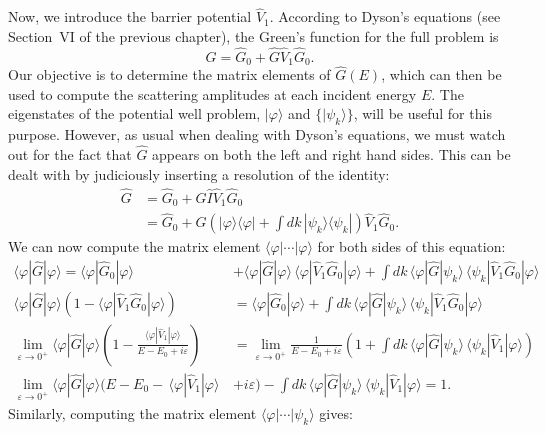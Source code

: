 \documentclass[pra,12pt]{revtex4}
\begin{document}
Now, we introduce the barrier potential $\hat{V}_1$.  According to
Dyson's equations (see Section~VI of the previous chapter), the
Green's function for the full problem is
$$\hat{G} = \hat{G}_0 + \hat{G} \hat{V}_1 \hat{G}_0.$$
Our objective is to determine the matrix elements of $\hat{G}(E)$,
which can then be used to compute the scattering amplitudes at each
incident energy $E$.  The eigenstates of the potential well problem,
$|\varphi\rangle$ and $\{|\psi_k\rangle\}$, will be useful for this
purpose.  However, as usual when dealing with Dyson's equations, we
must watch out for the fact that $\hat{G}$ appears on both the left
and right hand sides.  This can be dealt with by judiciously inserting
a resolution of the identity:
$$\begin{aligned}\hat{G} &= \hat{G}_0 + \hat{G} \hat{I} \hat{V}_1 \hat{G}_0 \\ &= \hat{G}_0 + \hat{G} \left(|\varphi\rangle\langle\varphi| + \int dk\, |\psi_k\rangle\langle\psi_k|\right) \hat{V}_1 \hat{G}_0. \end{aligned}$$
We can now compute the matrix element
$\langle\varphi|\cdots|\varphi\rangle$ for both sides of this equation:
$$\begin{aligned}\langle\varphi|\hat{G}|\varphi\rangle = \langle\varphi|\hat{G}_0|\varphi\rangle &+ \langle\varphi|\hat{G}|\varphi\rangle \, \langle\varphi|\hat{V}_1 \hat{G}_0|\varphi\rangle + \int dk\, \langle\varphi|\hat{G}|\psi_k\rangle \, \langle\psi_k| \hat{V}_1 \hat{G}_0|\varphi\rangle \\
\langle\varphi|\hat{G}|\varphi\rangle \left(1 - \langle\varphi|\hat{V}_1 \hat{G}_0|\varphi\rangle\right) &= \langle\varphi|\hat{G}_0|\varphi\rangle + \int dk\, \langle\varphi|\hat{G}|\psi_k\rangle \, \langle\psi_k| \hat{V}_1 \hat{G}_0|\varphi\rangle \\ \lim_{\varepsilon\rightarrow0^+}
\langle\varphi|\hat{G}|\varphi\rangle \left(1 - \frac{\langle\varphi|\hat{V}_1|\varphi\rangle}{E - E_0 + i\varepsilon}\right) &= \lim_{\varepsilon\rightarrow0^+} \frac{1}{E  - E_0 + i\varepsilon} \left(1+ \int dk\, \langle\varphi|\hat{G}|\psi_k\rangle \, \langle\psi_k| \hat{V}_1|\varphi\rangle \right) \\
\lim_{\varepsilon\rightarrow0^+} \langle\varphi|\hat{G}|\varphi\rangle \Big(E - E_0 -\, \langle\varphi|\hat{V}_1|\varphi\rangle \, & + i\varepsilon\Big) - \int dk\, \langle\varphi|\hat{G}|\psi_k\rangle \, \langle\psi_k| \hat{V}_1|\varphi\rangle = 1.\end{aligned}$$
Similarly, computing the matrix element
$\langle\varphi|\cdots|\psi_k\rangle$ gives:
\end{document}
